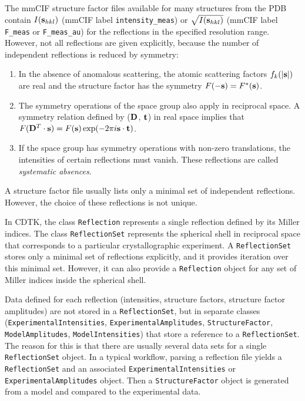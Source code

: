 \documentclass[11pt]{article}
\newcommand{\vect}[1]{{\bf #1}}
\newcommand{\mat}[1]{{\bf #1}}
\newcommand{\vs}{\vect{s}}
\newcommand{\vt}{\vect{t}}
\begin{document}
\begin{sloppy}
The mmCIF structure factor files available for many structures from
the PDB contain $I(\vs_{hkl})$ (mmCIF label \texttt{intensity\_meas})
or $\sqrt{I(\vs_{hkl})}$ (mmCIF label \texttt{F\_meas} or
\texttt{F\_meas\_au}) for the reflections in the specified resolution
range. However, not all reflections are given explicitly, because the
number of independent reflections is reduced by symmetry:
\begin{enumerate}
\item
In the absence of anomalous scattering, the atomic scattering factors
$f_k(|\vs|)$ are real and the structure factor has the symmetry
$F(-\vs) = F^{*}(\vs)$.
\item
The symmetry operations of the space group also apply in reciprocal
space. A symmetry relation defined by ($\mat{D}$, $\vt$) in real space
implies that $F(\mat{D}^T\cdot\vs) = F(\vs) \exp(-2\pi i \vs\cdot\vt)$.
\item
If the space group has symmetry operations with non-zero translations,
the intensities of certain reflections must vanish. These reflections
are called \textit{systematic absences}.
\end{enumerate}
A structure factor file usually lists only a minimal set of
independent reflections. However, the choice of these reflections is
not unique.

\vspace{3mm}

In CDTK, the class \texttt{Reflection} represents a single reflection
defined by its Miller indices. The class \texttt{ReflectionSet}
represents the spherical shell in reciprocal space that corresponds to
a particular crystallographic experiment. A \texttt{ReflectionSet} stores
only a minimal set of reflections explicitly, and it provides iteration
over this minimal set. However, it can also provide a \texttt{Reflection}
object for any set of Miller indices inside the spherical shell.

Data defined for each reflection (intensities, structure factors,
structure factor amplitudes) are not stored in a
\texttt{ReflectionSet}, but in separate classes
(\texttt{ExperimentalIntensities}, \texttt{ExperimentalAmplitudes},
\texttt{StructureFactor}, \texttt{ModelAmplitudes},
\texttt{ModelIntensities}) that store a reference to a
\texttt{ReflectionSet}. The reason for this is that there are usually
several data sets for a single \texttt{ReflectionSet} object. In a
typical workflow, parsing a reflection file yields a
\texttt{ReflectionSet} and an associated
\texttt{ExperimentalIntensities} or \texttt{ExperimentalAmplitudes}
object. Then a \texttt{StructureFactor} object is generated from
a model and compared to the experimental data.


\end{sloppy}
\end{document}
